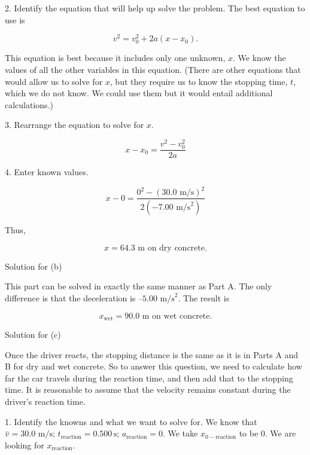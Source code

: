 \documentclass[
]{book}
\begin{document}
2. Identify the equation that will help up solve the problem. The best
equation to use is

\leavevmode{}%
\[{{{v^{2} = {v_{0}^{2} + 2a}}\left( {x - x_{0}} \right)}.}{}\]

This equation is best because it includes only one unknown, \(x{}\). We
know the values of all the other variables in this equation. (There are
other equations that would allow us to solve for \(x{}\), but they require
us to know the stopping time, \(t{}\), which we do not know. We could use
them but it would entail additional calculations.)

3. Rearrange the equation to solve for \(x{}\).

\leavevmode{}%
\[x - x_{0} = \frac{v^{2} - v_{0}^{2}}{2a}\]

4. Enter known values.

\leavevmode{}%
\[{{x - 0} = \frac{0^{2} - \left( {\text{30}\text{.}\text{0\ m/s}} \right)^{2}}{2\left( {{- 7}\text{.}\text{00\ m/s}^{2}} \right)}}{}\]

Thus,

\leavevmode{}%
\[{{x = \text{64}}\text{.}\text{3\ m\ on\ dry\ concrete}\text{.}}{}\]

{Solution for (b)}

This part can be solved in exactly the same manner as Part A. The only
difference is that the deceleration is
\({{–5}\text{.}\text{00\ m/s}^{2}}{}\). The result is

\leavevmode{}%
\[{{x_{\text{wet}} = \text{90}}\text{.}\text{0\ m\ on\ wet\ concrete}\text{.}}{}\]

{Solution for (c)}

Once the driver reacts, the stopping distance is the same as it is in
Parts A and B for dry and wet concrete. So to answer this question, we
need to calculate how far the car travels during the reaction time, and
then add that to the stopping time. It is reasonable to assume that the
velocity remains constant during the driver's reaction time.

1. Identify the knowns and what we want to solve for. We know that
\(\overset{-}{v} = \text{30.0\ m/s}\);
\(t_{\text{reaction}} = 0.500\,\text{s}\); \(a_{\text{reaction}} = 0\). We
take \(x_{0 - \text{reaction}}\) to be 0. We are looking for
\(x_{\text{reaction}}{}\).
\end{document}
